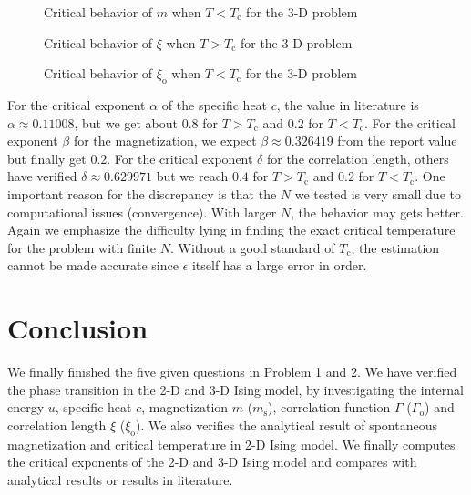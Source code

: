 \documentclass[english, nochinese]{pnote}
\begin{document}
\begin{figure}[htbp]
\centering
\scalebox{0.725}{}
\caption{Critical behavior of $m$ when $ T < T_{\text{c}}$ for the 3-D problem}
\label{Fig:CritMagLow3D}
\end{figure}

\begin{figure}[htbp]
\centering

\caption{Critical behavior of $\xi$ when $ T > T_{\text{c}}$ for the 3-D problem}
\label{Fig:CritXiHigh3D}
\end{figure}

\begin{figure}[htbp]
\centering

\caption{Critical behavior of $\xi_{\text{o}}$ when $ T < T_{\text{c}}$ for the 3-D problem}
\label{Fig:CritXiLow3D}
\end{figure}

For the critical exponent $\alpha$ of the specific heat $c$, the value in literature is $ \alpha \approx 0.11008 $, but we get about $0.8$ for $ T > T_{\text{c}} $ and $0.2$ for $ T < T_{\text{c}} $. For the critical exponent $\beta$ for the magnetization, we expect $ \beta \approx 0.326419 $ from the report value but finally get $0.2$. For the critical exponent $\delta$ for the correlation length, others have verified $ \delta \approx 0.629971 $ but we reach $0.4$ for $ T > T_{\text{c}} $ and $0.2$ for $ T < T_{\text{c}} $. One important reason for the discrepancy is that the $N$ we tested is very small due to computational issues (convergence). With larger $N$, the behavior may gets better. Again we emphasize the difficulty lying in finding the exact critical temperature for the problem with finite $N$. Without a good standard of $T_{\text{c}}$, the estimation cannot be made accurate since $\epsilon$ itself has a large error in order.

\section{Conclusion}

We finally finished the five given questions in Problem 1 and 2. We have verified the phase transition in the 2-D and 3-D Ising model, by investigating the internal energy $u$, specific heat $c$, magnetization $m$ ($m_{\text{s}}$), correlation function $\Gamma$ ($\Gamma_{\text{o}}$) and correlation length $\xi$ ($\xi_{\text{o}}$). We also verifies the analytical result of spontaneous magnetization and critical temperature in 2-D Ising model. We finally computes the critical exponents of the 2-D and 3-D Ising model and compares with analytical results or results in literature.
\end{document}
